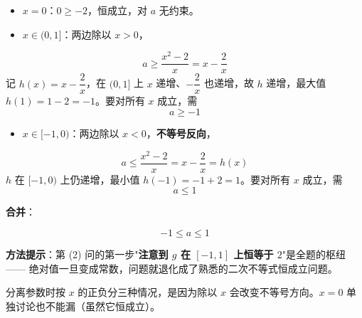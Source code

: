 \begin{itemize}
\item \textbf{$x=0$}：$0\ge-2$，恒成立，对 $a$ 无约束。
\item \textbf{$x\in(0,1]$}：两边除以 $x>0$，
\end{itemize}
\[a\ge\frac{x^{2}-2}x=x-\frac2x\]
  记 $h(x)=x-\dfrac2x$，在 $(0,1]$ 上 $x$ 递增、$-\dfrac2x$ 也递增，故 $h$ 递增，最大值 $h(1)=1-2=-1$。要对所有 $x$ 成立，需
\[a\ge-1\]
\begin{itemize}
\item \textbf{$x\in[-1,0)$}：两边除以 $x<0$，\textbf{不等号反向}，
\end{itemize}
\[a\le\frac{x^{2}-2}x=x-\frac2x=h(x)\]
  $h$ 在 $[-1,0)$ 上仍递增，最小值 $h(-1)=-1+2=1$。要对所有 $x$ 成立，需
\[a\le1\]

\textbf{合并}：

\[-1\le a\le1\]


\begin{gktip}
\textbf{方法提示}：第 (2) 问的第一步"\textbf{注意到 $g$ 在 $[-1,1]$ 上恒等于 $2$}"是全题的枢纽 —— 绝对值一旦变成常数，问题就退化成了熟悉的二次不等式恒成立问题。

分离参数时按 $x$ 的正负分三种情况，是因为除以 $x$ 会改变不等号方向。$x=0$ 单独讨论也不能漏（虽然它恒成立）。
\end{gktip}

\par\medskip

